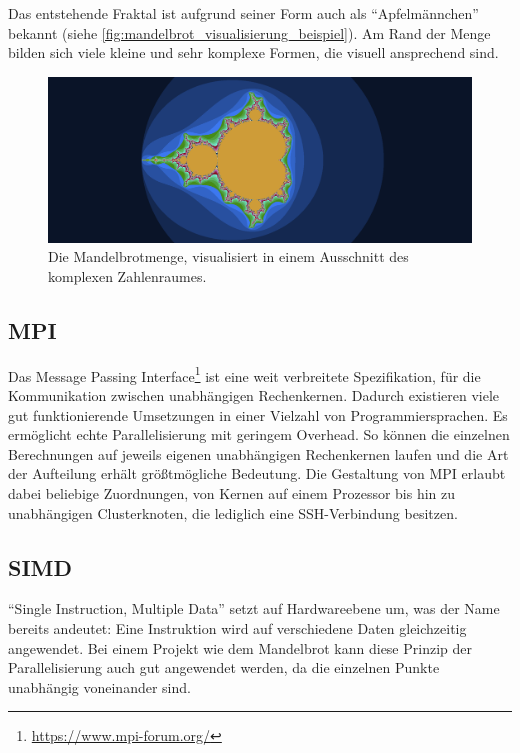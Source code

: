 Das entstehende Fraktal ist aufgrund seiner Form auch als “Apfelmännchen” bekannt (siehe \autoref{fig:mandelbrot_visualisierung_beispiel}).
Am Rand der Menge bilden sich viele kleine und sehr komplexe Formen, die visuell ansprechend sind.

\begin{figure}
	\centering
	\includegraphics[width=0.9\linewidth]{img/Einleitung/Mandelbrot_visualization_example.png}
	\caption{Die Mandelbrotmenge, visualisiert in einem Ausschnitt des komplexen Zahlenraumes.}
	\label{fig:mandelbrot_visualisierung_beispiel}
\end{figure}

\subsection{MPI}

Das Message Passing Interface\footnote{\url{https://www.mpi-forum.org/}} ist eine weit verbreitete Spezifikation, für die Kommunikation zwischen unabhängigen Rechenkernen.
Dadurch existieren viele gut funktionierende Umsetzungen in einer Vielzahl von Programmiersprachen.
Es ermöglicht echte Parallelisierung mit geringem Overhead.
So können die einzelnen Berechnungen auf jeweils eigenen unabhängigen Rechenkernen laufen und
die Art der Aufteilung erhält größtmögliche Bedeutung.
Die Gestaltung von MPI erlaubt dabei beliebige Zuordnungen, von Kernen auf einem Prozessor bis hin zu unabhängigen Clusterknoten, die lediglich eine SSH-Verbindung besitzen.



\subsection{SIMD} \label{par:introduction_simd}

\enquote{Single Instruction, Multiple Data} setzt auf Hardwareebene um, was der Name bereits andeutet:
Eine Instruktion wird auf verschiedene Daten gleichzeitig angewendet.
Bei einem Projekt wie dem Mandelbrot kann diese Prinzip der Parallelisierung auch gut angewendet werden,
da die einzelnen Punkte unabhängig voneinander sind.

